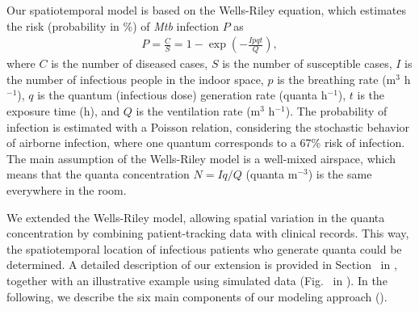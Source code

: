 \documentclass[fleqn,11pt]{wlscirep}
\begin{document}
Our spatiotemporal model is based on the Wells-Riley equation\cite{Riley1961Book}, which estimates the risk (probability in \%) of \emph{Mtb} infection $P$ as
\begin{align}
    P = \frac{C}{S} = 1 - \exp\left(-\frac{Ipqt}{Q}\right),
\end{align}
where $C$ is the number of diseased cases, $S$ is the number of susceptible cases, $I$ is the number of infectious people in the indoor space, $p$ is the breathing rate (m$^3$ h$^{-1}$), $q$ is the quantum (infectious dose) generation rate (quanta h$^{-1}$), $t$ is the exposure time (h), and $Q$ is the ventilation rate (m$^3$ h$^{-1}$). The probability of infection is estimated with a Poisson relation, considering the stochastic behavior of airborne infection, where one quantum corresponds to a 67\% risk of infection. The main assumption of the Wells-Riley model is a well-mixed airspace, which means that the quanta concentration $N = Iq/Q$ (quanta m$^{-3}$) is the same everywhere in the room. 

We extended the Wells-Riley model, allowing spatial variation in the quanta concentration by combining patient-tracking data with clinical records. This way, the spatiotemporal location of infectious patients who generate quanta could be determined. A detailed description of our extension is provided in Section~ in \supp, together with an illustrative example using simulated data (Fig.~ in \supp). In the following, we describe the six main components of our modeling approach ().
\end{document}
